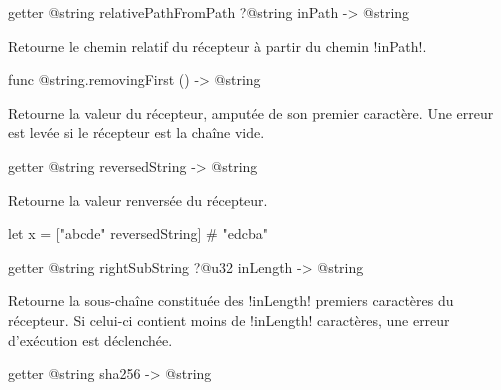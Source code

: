 
\begin{galgas4box}
getter @string relativePathFromPath ?@string inPath -> @string
\end{galgas4box}

Retourne le chemin relatif du récepteur à partir du chemin \ggsq!inPath!.










\begin{galgas4box}
func @string.removingFirst () -> @string
\end{galgas4box}

Retourne la valeur du récepteur, amputée de son premier caractère. Une erreur est levée si le récepteur est la chaîne vide.










\begin{galgas4box}
getter @string reversedString -> @string
\end{galgas4box}

Retourne la valeur renversée du récepteur.

\begin{galgas4}
let x = ["abcde" reversedString] # "edcba"
\end{galgas4}









\begin{galgas4box}
getter @string rightSubString ?@u32 inLength -> @string
\end{galgas4box}

Retourne la sous-chaîne constituée des \ggsq!inLength! premiers caractères du récepteur. Si celui-ci contient moins de \ggsq!inLength! caractères, une erreur d'exécution est déclenchée.




\begin{galgas4box}
getter @string sha256 -> @string
\end{galgas4box}

